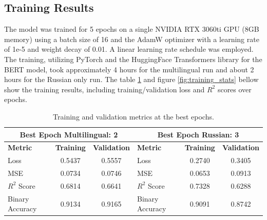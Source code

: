 \documentclass[twoside]{ctuthesis}
\theoremstyle{plain}
\theoremstyle{definition}
\theoremstyle{note}
\begin{document}
\subsection{Training Results}

The model was trained for 5 epochs on a single NVIDIA RTX 3060ti GPU (8GB memory) using a batch size of 16 and the AdamW optimizer with a learning rate of 1e-5 and weight decay of 0.01. A linear learning rate schedule was employed. The training, utilizing PyTorch and the HuggingFace Transformers library for the BERT model, took approximately 4 hours for the multilingual run and about 2 hours for the Russian only run. The table \ref{tab:combined_best_epoch_results} and figure \ref{fig:training_stats} bellow show the training results, including training/validation loss and $R^2$ scores over epochs.\par

\begin{table}[ht]
    \centering
    \caption{Training and validation metrics at the best epochs.}
    \label{tab:combined_best_epoch_results}
    \begin{tabular}{lcc|lcc}
        \toprule
        \multicolumn{3}{c|}{\textbf{Best Epoch Multilingual: 2}} & \multicolumn{3}{c}{\textbf{Best Epoch Russian: 3}} \\
        \midrule
        \textbf{Metric} & \textbf{Training} & \textbf{Validation} & \textbf{Metric} & \textbf{Training} & \textbf{Validation} \\
        \midrule
        Loss            & 0.5437 & 0.5557 & Loss            & 0.2740 & 0.3405 \\
        MSE              & 0.0734 & 0.0746 & MSE             & 0.0653 & 0.0913 \\
        $R^2$ Score      & 0.6814 & 0.6641 & $R^2$ Score     & 0.7328 & 0.6288 \\
        Binary Accuracy  & 0.9134 & 0.9165 & Binary Accuracy & 0.9091 & 0.8742 \\
        \bottomrule
    \end{tabular}
\end{table}
\end{document}
